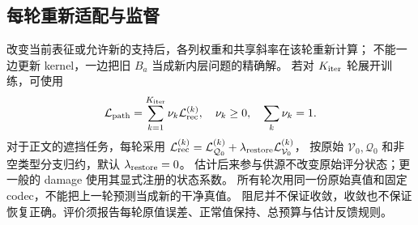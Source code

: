 \documentclass[11pt,UTF8,fontset=fandol]{ctexart}
\numberwithin{equation}{section}
\theoremstyle{definition}
\newcommand{\Vset}{\mathcal V}
\newcommand{\Qset}{\mathcal Q}
\begin{document}
\subsection{每轮重新适配与监督}
改变当前表征或允许新的支持后，各列权重和共享斜率在该轮重新计算；
不能一边更新 kernel，一边把旧 $B_a$ 当成新内层问题的精确解。
若对 $K_{\rm iter}$ 轮展开训练，可使用
\begin{equation}
 \mathcal L_{\rm path}=\sum_{k=1}^{K_{\rm iter}}\nu_k\mathcal L_{\rm rec}^{(k)},
 \quad\nu_k\ge0,\quad\sum_k\nu_k=1.
 \label{v51:eq:iterative-loss}
\end{equation}
对于正文的遮挡任务，每轮采用
$\mathcal L_{\rm rec}^{(k)}=\mathcal L_{\Qset_0}^{(k)}+\lambda_{\rm restore}\mathcal L_{\Vset_0}^{(k)}$，
按原始 $\Vset_0,\Qset_0$ 和非空类型分支归约，默认 $\lambda_{\rm restore}=0$。
估计后来参与供源不改变原始评分状态；更一般的 damage 使用其显式注册的状态系数。
所有轮次用同一份原始真值和固定 codec，不能把上一轮预测当成新的干净真值。
阻尼并不保证收敛，收敛也不保证恢复正确。评价须报告每轮原值误差、正常值保持、总预算与估计反馈规则。
\end{document}
